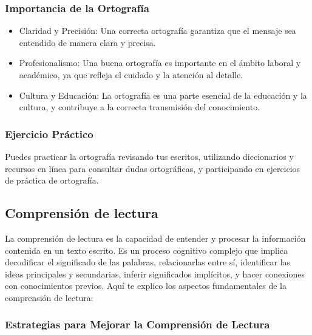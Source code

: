 \subsubsection{Importancia de la Ortografía}

\begin{itemize}
      \item Claridad y Precisión: Una correcta ortografía garantiza que el mensaje sea entendido de manera clara y precisa.
      \item Profesionalismo: Una buena ortografía es importante en el ámbito laboral y académico, ya que refleja el cuidado y la atención al detalle.
      \item Cultura y Educación: La ortografía es una parte esencial de la educación y la cultura, y contribuye a la correcta transmisión del conocimiento.
\end{itemize}

\subsubsection{Ejercicio Práctico}

Puedes practicar la ortografía revisando tus escritos, utilizando diccionarios y recursos en línea para consultar dudas ortográficas, y participando en ejercicios de práctica de ortografía.

\subsection{Comprensión de lectura}

La comprensión de lectura es la capacidad de entender y procesar la información contenida en un texto escrito. Es un proceso cognitivo complejo que implica decodificar el significado de las palabras, relacionarlas entre sí, identificar las ideas principales y secundarias, inferir significados implícitos, y hacer conexiones con conocimientos previos. Aquí te explico los aspectos fundamentales de la comprensión de lectura:

\subsubsection{Estrategias para Mejorar la Comprensión de Lectura}

